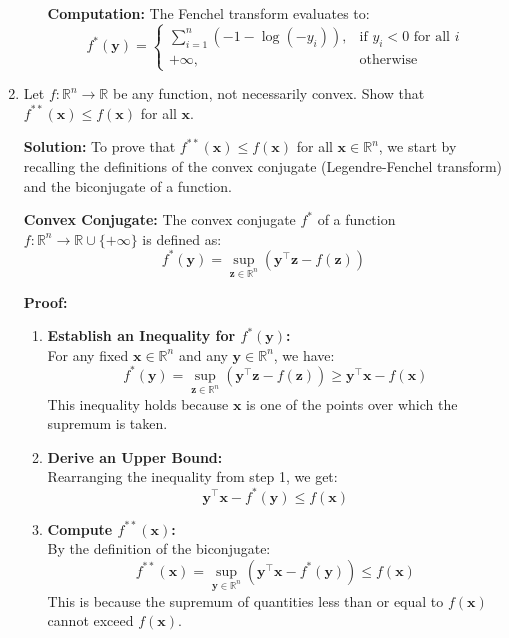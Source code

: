 \documentclass{article}
\begin{document}
\begin{enumerate}
\begin{enumerate}
        \textbf{Computation:}
        The Fenchel transform evaluates to:
        \[
        f^*(\mathbf{y}) = \begin{cases}
        \sum_{i=1}^n \left( -1 - \log(-y_i) \right), & \text{if } y_i < 0 \text{ for all } i \\
        +\infty, & \text{otherwise}
        \end{cases}
        \]
    \end{enumerate}
    
    \item Let $f: \mathbb{R}^n \longrightarrow \mathbb{R}$ be any function, not necessarily convex. Show that $f^{**}(\mathbf{x}) \leq f(\mathbf{x})$ for all $\mathbf{x}$.
    
    \textbf{Solution:} To prove that $f^{**}(\mathbf{x}) \leq f(\mathbf{x})$ for all $\mathbf{x} \in \mathbb{R}^n$, we start by recalling the definitions of the convex conjugate (Legendre-Fenchel transform) and the biconjugate of a function.

    \textbf{Convex Conjugate:}
    The convex conjugate $f^*$ of a function $f: \mathbb{R}^n \rightarrow \mathbb{R} \cup \{+\infty\}$ is defined as:
    \[
    f^*(\mathbf{y}) = \sup_{\mathbf{z} \in \mathbb{R}^n} \left( \mathbf{y}^\top \mathbf{z} - f(\mathbf{z}) \right)
    \]

    \textbf{Proof:}
    \begin{enumerate}
        \item \textbf{Establish an Inequality for $f^*(\mathbf{y})$:}\\
        For any fixed $\mathbf{x} \in \mathbb{R}^n$ and any $\mathbf{y} \in \mathbb{R}^n$, we have:
        \[
        f^*(\mathbf{y}) = \sup_{\mathbf{z} \in \mathbb{R}^n} \left( \mathbf{y}^\top \mathbf{z} - f(\mathbf{z}) \right) \geq \mathbf{y}^\top \mathbf{x} - f(\mathbf{x})
        \]
        This inequality holds because $\mathbf{x}$ is one of the points over which the supremum is taken.

        \item \textbf{Derive an Upper Bound:}\\
        Rearranging the inequality from step 1, we get:
        \[
        \mathbf{y}^\top \mathbf{x} - f^*(\mathbf{y}) \leq f(\mathbf{x})
        \]

        \item \textbf{Compute $f^{**}(\mathbf{x})$:}\\
        By the definition of the biconjugate:
        \[
        f^{**}(\mathbf{x}) = \sup_{\mathbf{y} \in \mathbb{R}^n} \left( \mathbf{y}^\top \mathbf{x} - f^*(\mathbf{y}) \right) \leq f(\mathbf{x})
        \]
        This is because the supremum of quantities less than or equal to $f(\mathbf{x})$ cannot exceed $f(\mathbf{x})$.
    \end{enumerate}


\end{enumerate}
\end{document}

